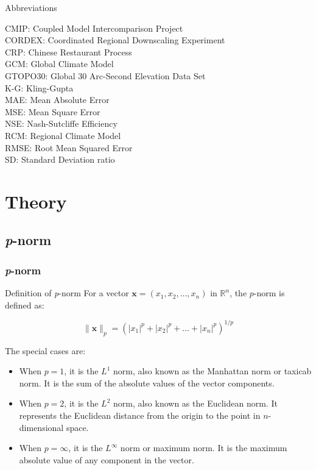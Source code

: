 \documentclass[xcolor={dvipsnames}]{beamer}
\begin{document}
\begin{frame}{Abbreviations}

CMIP: Coupled Model Intercomparison Project\\
CORDEX: Coordinated Regional Downscaling Experiment\\
CRP: Chinese Restaurant Process \\
GCM: Global Climate Model\\
GTOPO30: Global 30 Arc-Second Elevation Data Set\\
K-G: Kling-Gupta\\
MAE: Mean Absolute Error\\
MSE: Mean Square Error\\
NSE: Nash-Sutcliffe Efficiency\\
RCM: Regional Climate Model\\
RMSE: Root Mean Squared Error\\
SD: Standard Deviation ratio 


\end{frame}

\section{Theory}

\subsection{\textit{p}-norm}

\begin{frame}
\frametitle{\textit{p}-norm}

\begin{alertblock}{Definition of \textit{p}-norm}
For a vector \( \mathbf{x} = (x_1, x_2, \ldots, x_n) \) in \( \mathbb{R}^n \), the \( p \)-norm is defined as:

\[ \| \mathbf{x} \|_p = \left( |x_1|^p + |x_2|^p + \ldots + |x_n|^p \right)^{1/p} \]
\end{alertblock}



The special cases are:

\begin{itemize}
\item<1-> When \( p = 1 \), it is the \( L^1 \) norm, also known as the Manhattan norm or taxicab norm. It is the sum of the absolute values of the vector components.

\item<2-> When \( p = 2 \), it is the \( L^2 \) norm, also known as the Euclidean norm. It represents the Euclidean distance from the origin to the point in \( n \)-dimensional space.

\item<3-> When \( p = \infty \), it is the \( L^\infty \) norm or maximum norm. It is the maximum absolute value of any component in the vector.
\end{itemize}

\end{frame}
\end{document}

